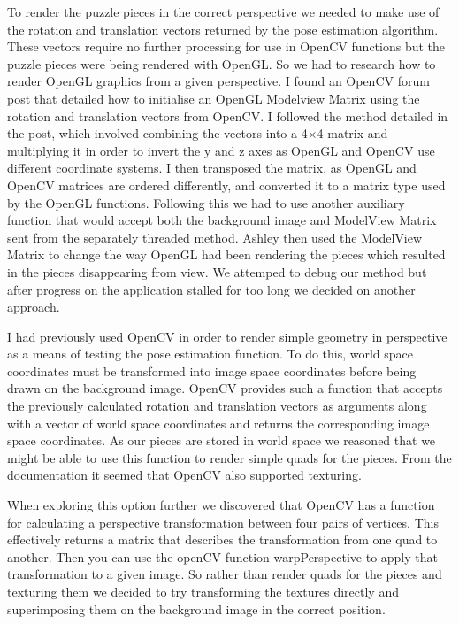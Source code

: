 \documentclass{article}
\begin{document}
To render the puzzle pieces in the correct perspective we needed to make use of the rotation and translation vectors returned by the pose estimation algorithm. These vectors require no further processing for use in OpenCV functions but the puzzle pieces were being rendered with OpenGL. So we had to research how to render OpenGL graphics from a given perspective. %
 I found an OpenCV forum post that detailed how to initialise an OpenGL Modelview Matrix using the rotation and translation vectors from OpenCV. I followed the method detailed in the post, which involved combining the vectors into a 4$\times$4 matrix and multiplying it in order to invert the y and z axes as OpenGL and OpenCV use different coordinate systems. I then transposed the matrix, as OpenGL and OpenCV matrices are ordered differently, and converted it to a matrix type used by the OpenGL functions. Following this we had to use another auxiliary function that would accept both the background image and ModelView Matrix sent from the separately threaded method. Ashley then used the ModelView Matrix to change the way OpenGL had been rendering the pieces which resulted in the pieces disappearing from view. We attemped to debug our method but after progress on the application stalled for too long we decided on another approach. 


I had previously used OpenCV in order to render simple geometry in perspective as a means of testing the pose estimation function. To do this, world space coordinates must be transformed into image space coordinates before being drawn on the background image. OpenCV provides such a function that accepts the previously calculated rotation and translation vectors as arguments along with a vector of world space coordinates and returns the corresponding image space coordinates. As our pieces are stored in world space we reasoned that we might be able to use this function to render simple quads for the pieces. From the documentation it seemed that OpenCV also supported texturing. 

When exploring this option further we discovered that OpenCV has a function for calculating a perspective transformation between four pairs of vertices. This effectively returns a matrix that describes the transformation from one quad to another. Then you can use the openCV function warpPerspective to apply that transformation to a given image. So rather than render quads for the pieces and texturing them we decided to try transforming the textures directly and superimposing them on the background image in the correct position. 
\end{document}
